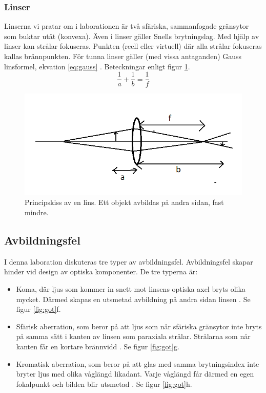 \documentclass[a4paper]{article}
\begin{document}
\subsubsection{Linser}
Linserna vi pratar om i laborationen är två sfäriska, sammanfogade gränsytor som buktar utåt (konvexa). Även i linser gäller 
Snells brytningslag. Med hjälp av linser kan strålar fokuseras. Punkten (reell eller virtuell) där alla strålar fokuseras
kallas brännpunkten. För tunna linser gäller (med vissa antaganden) Gauss linsformel, ekvation \ref{eq:gauss} \cite[p.230]{vl}. Beteckningar enligt
figur \ref{fig:lens}.
\begin{equation}
    \frac{1}{a} + \frac{1}{b} = \frac{1}{f}
    \label{eq:gauss}
\end{equation}
\begin{figure}[h!]
    \includegraphics[height=0.3\textheight]{lens.png}
    \caption{Principskiss av en lins. Ett objekt avbildas på andra sidan, fast mindre.}
    \label{fig:lens}
\end{figure}
\subsection{Avbildningsfel}
I denna laboration diskuteras tre typer av avbildningsfel. Avbildningsfel skapar hinder vid design av optiska komponenter.
De tre typerna är:
\begin{itemize}
    \item Koma, där ljus som kommer in snett mot linsens optiska axel bryts olika mycket. Därmed skapas en utsmetad
    avbildning på andra sidan linsen \cite{ins}. Se figur \ref{fig:got}f.
    \item Sfärisk aberration, som beror på att ljus som når sfäriska gränsytor inte bryts på samma sätt i kanten av linsen som paraxiala strålar.
    Strålarna som når kanten får en kortare brännvidd \cite[p.238]{vl}. Se figur \ref{fig:got}g.
    \item Kromatisk aberration, som beror på att glas med samma brytningsindex inte bryter ljus med olika våglängd
    likadant. Varje våglängd får därmed en egen fokalpunkt och bilden blir utsmetad  \cite[p.237]{vl}. Se figur \ref{fig:got}h.
\end{itemize}
\end{document}

